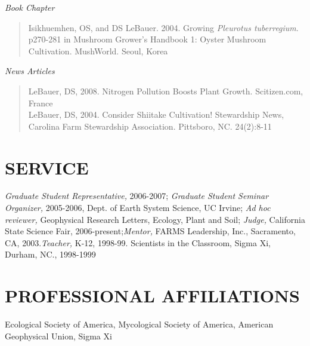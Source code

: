 \documentclass[line,10pt]{res}
\begin{document}
\begin{resume}
{\sl Book Chapter}
\begin{verse}
 Isikhuemhen, OS, and DS LeBauer. 2004. Growing \textit{Pleurotus tuberregium}. p270-281 in Mushroom Grower's Handbook 1: Oyster Mushroom Cultivation. MushWorld. Seoul, Korea\\
\end{verse}

{\sl News Articles}
\begin{verse} 
 LeBauer, DS, 2008. Nitrogen Pollution Boosts Plant Growth. Scitizen.com, France\\
 LeBauer, DS, 2004. Consider Shiitake Cultivation! Stewardship News, Carolina Farm Stewardship Association. Pittsboro, NC. 24(2):8-11 \end{verse}

\section{SERVICE} {\sl Graduate Student Representative,} 2006-2007;  {\sl Graduate Student Seminar Organizer,} 2005-2006, Dept. of Earth System Science, UC Irvine;  {\sl  Ad hoc reviewer,} Geophysical Research Letters, Ecology, Plant and Soil; {\sl Judge,} California State Science Fair, 2006-present;{\sl Mentor,} FARMS Leadership, Inc., Sacramento, CA, 2003.{\sl  Teacher,} K-12, 1998-99. Scientists in the Classroom, Sigma Xi, Durham, NC., 1998-1999

\section{PROFESSIONAL AFFILIATIONS} Ecological Society of America, Mycological Society of America, American Geophysical Union, Sigma Xi

\end{resume}
\end{document}
